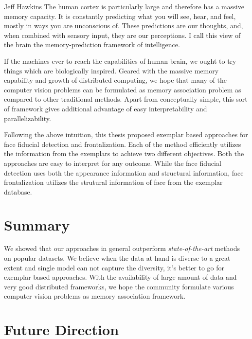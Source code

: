 
\begin{chapquote}{Jeff Hawkins} 
The human cortex is particularly large and therefore has a massive memory
capacity. It is constantly predicting what you will see, hear, and feel, mostly in
ways you are unconscious of. These predictions are our thoughts, and, when
combined with sensory input, they are our perceptions. I call this view of the brain
the memory-prediction framework of intelligence. 

\end{chapquote}

If the machines ever to reach the capabilities of human brain, we ought to try things 
which are biologically inspired. Geared with the massive memory capability and growth 
of distributed computing, we hope that many of the computer vision problems can be 
formulated as memory association problem as compared to other traditional methods. 
Apart from conceptually simple, this sort of framework gives additional advantage of 
easy interpretability and parallelizability.

Following the above intuition, this thesis proposed exemplar based approaches for face 
fiducial detection and frontalization. Each of the method efficiently utilizes the 
information from the exemplars to achieve two different objectives. Both the approaches
are easy to interpret for any outcome. While the face fiducial detection uses both the
appearance information and structural information, face frontalization utilizes the 
strutural information of face from the exemplar database. 

\section{Summary}
We showed that our approaches in general outperform \textit{state-of-the-art} methods on 
popular datasets. We believe when the data at hand is diverse to a great extent and single 
model can not capture the diversity, it's better to go for exemplar based approaches.
With the availability of large amount of data and very good distributed frameworks, we
hope the community formulate various computer vision problems as memory association 
framework.

\section{Future Direction}

